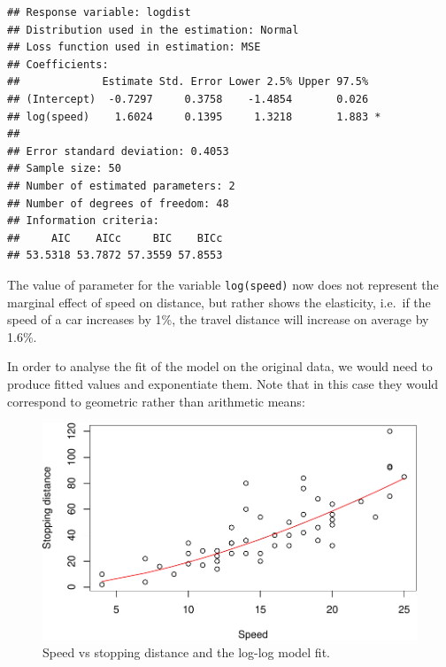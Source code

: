 \documentclass[
]{book}
\newenvironment{Shaded}{\begin{snugshade}}{\end{snugshade}}
\newcommand{\DataTypeTok}[1]{\textcolor[rgb]{0.13,0.29,0.53}{#1}}
\newcommand{\KeywordTok}[1]{\textcolor[rgb]{0.13,0.29,0.53}{\textbf{#1}}}
\newcommand{\NormalTok}[1]{#1}
\newcommand{\OperatorTok}[1]{\textcolor[rgb]{0.81,0.36,0.00}{\textbf{#1}}}
\newcommand{\StringTok}[1]{\textcolor[rgb]{0.31,0.60,0.02}{#1}}
\theoremstyle{definition}
\theoremstyle{definition}
\theoremstyle{definition}
\theoremstyle{definition}
\theoremstyle{remark}
\begin{document}
\begin{verbatim}
## Response variable: logdist
## Distribution used in the estimation: Normal
## Loss function used in estimation: MSE
## Coefficients:
##             Estimate Std. Error Lower 2.5% Upper 97.5%  
## (Intercept)  -0.7297     0.3758    -1.4854       0.026  
## log(speed)    1.6024     0.1395     1.3218       1.883 *
## 
## Error standard deviation: 0.4053
## Sample size: 50
## Number of estimated parameters: 2
## Number of degrees of freedom: 48
## Information criteria:
##     AIC    AICc     BIC    BICc 
## 53.5318 53.7872 57.3559 57.8553
\end{verbatim}

The value of parameter for the variable \texttt{log(speed)} now does not represent the marginal effect of speed on distance, but rather shows the elasticity, i.e.~if the speed of a car increases by 1\%, the travel distance will increase on average by 1.6\%.

In order to analyse the fit of the model on the original data, we would need to produce fitted values and exponentiate them. Note that in this case they would correspond to geometric rather than arithmetic means:

\begin{Shaded}
\end{Shaded}

\begin{figure}
\centering
\includegraphics{Svetunkov---Statistics-for-Business-Analytics_files/figure-latex/speedDistanceLogExp-1.pdf}
\caption{\label{fig:speedDistanceLogExp}Speed vs stopping distance and the log-log model fit.}
\end{figure}
\end{document}
